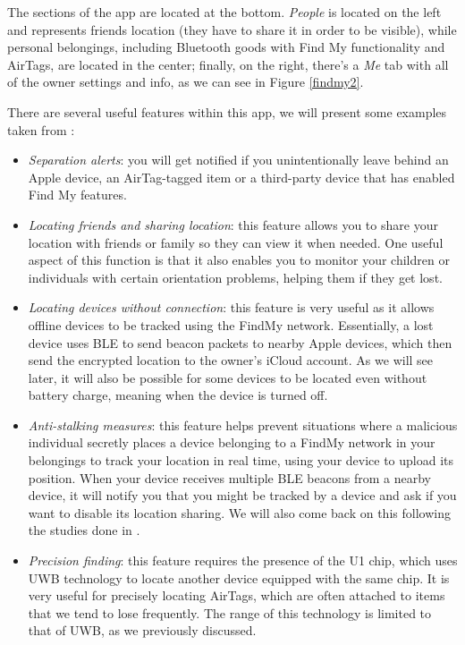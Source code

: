 \documentclass[english]{article}
\begin{document}
The sections of the app are located at the bottom. \textit{People} is located on the left and represents friends location (they have to share it in order to be visible), while personal belongings, including Bluetooth goods with Find My functionality and AirTags, are located in the center; finally, on the right, there's a \textit{Me} tab with all of the owner settings and info, as we can see in Figure \ref{findmy2}.

There are several useful features within this app, we will present some examples taken from \cite{Clover_2022}:
\begin{itemize}
  \item \textit{Separation alerts}: you will get notified if you unintentionally leave behind an Apple device, an AirTag-tagged item or a third-party device that has enabled Find My features.
  \item \textit{Locating friends and sharing location}: this feature allows you to share your location with friends or family so they can view it when needed. One useful aspect of this function is that it also enables you to monitor your children or individuals with certain orientation problems, helping them if they get lost.
  \item \textit{Locating devices without connection}: this feature is very useful as it allows offline devices to be tracked using the FindMy network. Essentially, a lost device uses BLE to send beacon packets to nearby Apple devices, which then send the encrypted location to the owner's iCloud account. As we will see later, it will also be possible for some devices to be located even without battery charge, meaning when the device is turned off.
  \item \textit{Anti-stalking measures}: this feature helps prevent situations where a malicious individual secretly places a device belonging to a FindMy network in your belongings to track your location in real time, using your device to upload its position. When your device receives multiple BLE beacons from a nearby device, it will notify you that you might be tracked by a device and ask if you want to disable its location sharing. We will also come back on this following the studies done in \cite{airguard}.
  \item \textit{Precision finding}: this feature requires the presence of the U1 chip, which uses UWB technology to locate another device equipped with the same chip. It is very useful for precisely locating AirTags, which are often attached to items that we tend to lose frequently. The range of this technology is limited to that of UWB, as we previously discussed.
\end{itemize}
\end{document}
